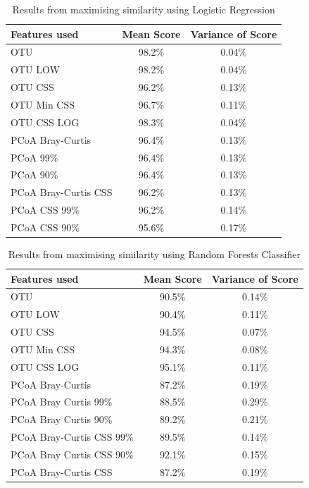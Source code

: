 \begin{table}
\caption{Results from maximising similarity using Logistic Regression}
\centering
\label{table:lrsimilarity}
\begin{tabular}{l c  c}
\hline 
Features used & Mean Score & Variance of Score \\ 
 
\hline
OTU & 98.2\% & 0.04\%   \\
OTU LOW &98.2\% &0.04\%\\
OTU CSS & 96.2\% & 0.13\%   \\
OTU Min CSS & 96.7\% & 0.11\%   \\
OTU CSS LOG & 98.3\% & 0.04\% \\
PCoA Bray-Curtis &96.4\% & 0.13\%   \\
PCoA 99\%      &  96.4\%& 0.13\%\\
PCoA 90\%       & 96.4\% &0.13\%\\
PCoA Bray-Curtis CSS &96.2\% & 0.13\%   \\
PCoA CSS 99\%    &96.2\%&0.14\%\\
PCoA CSS 90\%  &  95.6\% &0.17\%\\
\hline 
\end{tabular}
\end{table}
\begin{table}
	\caption{Results from maximising similarity using Random Forests Classifier}
	\centering
	\label{table:rfrsimilarity}
	\begin{tabular}{l c  c}
		\hline 
		Features used & Mean Score & Variance of Score \\ 
		
		\hline
		OTU & 90.5\% & 0.14\%   \\
		OTU LOW& 90.4\% &0.11\% \\
		OTU CSS & 94.5\% & 0.07\%   \\
		OTU Min CSS & 94.3\% & 0.08\%   \\
		OTU CSS LOG & 95.1\% & 0.11\% \\
		PCoA Bray-Curtis &87.2\% & 0.19\%   \\
		PCoA Bray Curtis 99\%&        88.5\% &0.29\%\\
		PCoA Bray Curtis 90\% &       89.2\%&0.21\%\\
		PCoA Bray-Curtis CSS 99\% &    89.5\%&0.14\%\\
		PCoA Bray Curtis CSS 90\%   & 92.1\% &0.15\%\\
		PCoA Bray-Curtis CSS &87.2\% & 0.19\%   \\
		
		\hline 
	\end{tabular}
\end{table}


